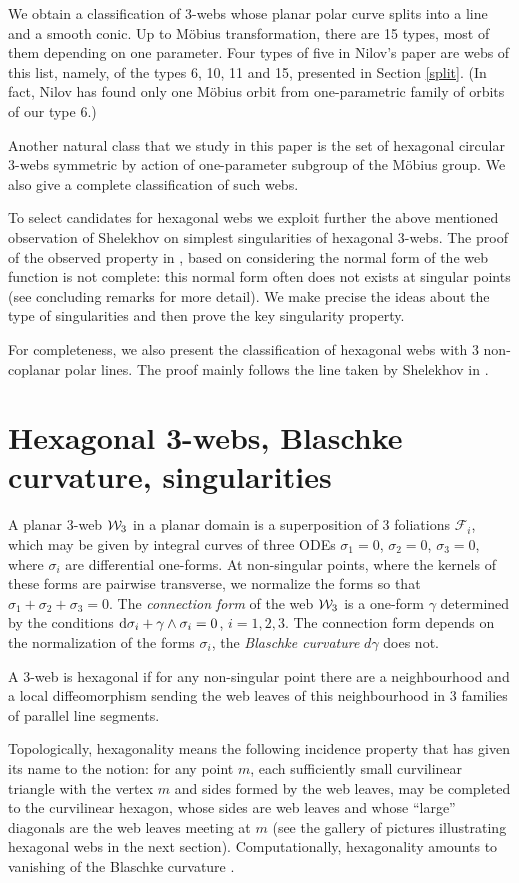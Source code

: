 \documentclass[pdftex]{sigma}
\numberwithin{equation}{section}
\begin{document}
We obtain a classification of 3-webs whose planar polar curve splits into a line and a smooth conic. Up to M\"obius transformation, there are 15 types, most of them depending on one parameter. Four types of five in Nilov's paper \cite{N-14} are webs of this list, namely, of the types 6, 10, 11 and 15, presented in Section \ref{split}. (In fact, Nilov has found only one M\"obius orbit from one-parametric family of orbits of our type 6.)

Another natural class that we study in this paper is the set of hexagonal circular 3-webs symmetric by action of one-parameter subgroup of the M\"obius group. We also give a complete classification of such webs.

To select candidates for hexagonal webs we exploit further the above mentioned observation of Shelekhov on simplest singularities of hexagonal 3-webs. The proof of the observed property in \cite{S-05}, based on considering the normal form of the web function is not complete: this normal form often does not exists at singular points (see concluding remarks for more detail). We make precise the ideas about the type of singularities and then prove the key singularity property.

For completeness, we also present the classification of hexagonal webs with 3 non-coplanar polar lines. The proof mainly follows the line taken by Shelekhov in \cite{S-05}.

\section{Hexagonal 3-webs, Blaschke curvature, singularities}
A planar 3-web ${\cal W}_3$ in a planar domain is a superposition of 3 foliations $\mathcal{F}_i$, which may be given by integral curves of three ODEs
$
\sigma _1=0$, $\sigma _2=0$, $ \sigma _3=0$,
where $\sigma _i$ are differential one-forms. At non-singular points, where the kernels of these forms are pairwise transverse, we normalize the forms so that
$\sigma_1+\sigma_2+\sigma_3=0.$ The {\it connection form} of the web ${\cal W}_3$ is a one-form $\gamma$ determined by the conditions
${\rm d}\sigma_i+\gamma \wedge \sigma_i=0$, $i=1,2,3$.
The connection form depends on the normalization of the forms $\sigma_i$, the {\it Blaschke curvature} $d\gamma$ does not.
\begin{Definition}
A 3-web is hexagonal if for any non-singular point there are a neighbourhood and a local diffeomorphism sending the web leaves of this neighbourhood in 3 families of parallel line segments.
\end{Definition}
Topologically, hexagonality means the following incidence property that has given its name to the notion: for any point $m$, each sufficiently small curvilinear triangle with the vertex $m$ and sides formed by the web leaves, may be completed to the curvilinear hexagon, whose sides are web leaves and whose ``large'' diagonals are the web leaves meeting at $m$ (see the gallery of pictures illustrating hexagonal webs in the next section). Computationally, hexagonality amounts to vanishing of the Blaschke curvature \cite{BB-38}.
\end{document}
